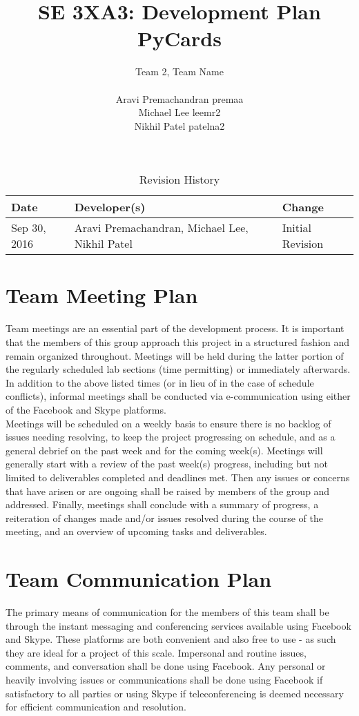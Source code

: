 \documentclass{article}
\title{SE 3XA3: Development Plan\\PyCards}
\author{Team 2, Team Name \\ \\ Aravi Premachandran premaa \\ Michael Lee leemr2
\\ Nikhil Patel patelna2 }
\date{}
\begin{document}
\maketitle

\begin{table}[hp]
\caption{Revision History} \label{TblRevisionHistory}
\begin{tabularx}{\textwidth}{llX}
\toprule
\textbf{Date} & \textbf{Developer(s)}& \textbf{Change}\\
\midrule
Sep 30, 2016 & Aravi Premachandran, Michael Lee, Nikhil Patel
& Initial Revision\\ 
\bottomrule
\end{tabularx}
\end{table}

\section{Team Meeting Plan}

\noindent Team meetings are an essential part of the development process. It is
important that the members of this group approach this project in a structured
fashion and remain organized throughout. Meetings will be held during the latter
portion of the regularly scheduled lab sections (time permitting) or immediately
afterwards. In addition to the above listed times (or in lieu of in the case of
schedule conflicts), informal meetings shall be conducted via e-communication
using either of the Facebook and Skype platforms.\\Meetings will be scheduled on
a weekly basis to ensure there is no backlog of issues needing resolving, to
keep the project progressing on schedule, and as a general debrief on the past
week and for the coming week(s). Meetings will generally start with a review of
the past week(s) progress, including but not limited to deliverables completed
and deadlines met. Then any issues or concerns that have arisen or are ongoing
shall be raised by members of the group and addressed. Finally, meetings shall
conclude with a summary of progress, a reiteration of changes made and/or issues
resolved during the course of the meeting, and an overview of upcoming tasks and
deliverables.

\section{Team Communication Plan}

\noindent The primary means of communication for the members of this team shall
be through the instant messaging and conferencing services available using
Facebook and Skype. These platforms are both convenient and also free to use -
as such they are ideal for a project of this scale. Impersonal and routine
issues, comments, and conversation shall be done using Facebook. Any personal or
heavily involving issues or communications shall be done using Facebook if
satisfactory to all parties or using Skype if teleconferencing is deemed
necessary for efficient communication and resolution.
\end{document}
